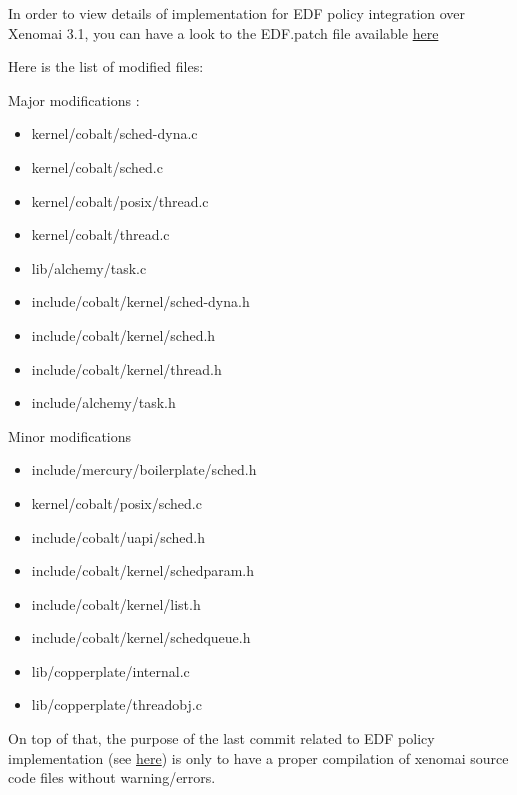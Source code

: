 \documentclass[12pt,hidelinks]{article}
\begin{document}
{        In order to view details of implementation for EDF policy integration over Xenomai 3.1, you can have a look to the EDF.patch file available \href{https://github.com/skyultime/M2_ERTS_Project_xenomai_edh/blob/dev/SourceCode/Patch/EDF.patch}{here}

        Here is the list of modified files:
        
        Major modifications :
        \begin{itemize}
            \item kernel/cobalt/sched-dyna.c
            \item kernel/cobalt/sched.c
            \item kernel/cobalt/posix/thread.c
            \item kernel/cobalt/thread.c
            \item lib/alchemy/task.c
            \item include/cobalt/kernel/sched-dyna.h
            \item include/cobalt/kernel/sched.h
            \item include/cobalt/kernel/thread.h
            \item include/alchemy/task.h
        \end{itemize}
        
        Minor modifications
        \begin{itemize}
            \item         include/mercury/boilerplate/sched.h
            \item kernel/cobalt/posix/sched.c
            \item include/cobalt/uapi/sched.h
            \item include/cobalt/kernel/schedparam.h
            \item include/cobalt/kernel/list.h
            \item include/cobalt/kernel/schedqueue.h
            \item lib/copperplate/internal.c
            \item lib/copperplate/threadobj.c
        \end{itemize}

    On top of that, the purpose of the last commit related to EDF policy implementation (see \href{https://github.com/skyultime/Xenomai-EDH/commit/37aed321405df633a39f17e16ad50599cadb9ed9}{here}) is only to have a proper compilation of xenomai source code files without warning/errors.\newline

}
\end{document}
